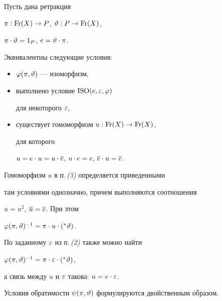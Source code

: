 \begin{thm} Пусть дана ретракция


$\pi: \operatorname{Fr}(X)\to P$, $\vartheta : P\to \operatorname{Fr}(X)$,


$\pi\cdot\vartheta=1_P$, $ e=\vartheta\cdot\pi$.


Эквивалентны следующие условия:


\begin{itemize}


\item[(1)] $\varphi(\pi,\vartheta)$ --- изоморфизм,


\item[(2)] выполнено условие ${\mathrm{ISO}}(e,\varepsilon,\varphi) $


для некоторого $ \varepsilon $,


\item[(3)] существует гомоморфизм $u:\operatorname{Fr}(X)\to \operatorname{Fr}(X)$,


для которого


$u= e\cdot u=u\cdot\overline{e}$, $u\cdot e=e$, $\overline{e}\cdot u= \overline{e}$.


\end{itemize}





Гомоморфизм $u$ в п.\,{\em (3)} определяется приведенными


там условиями однозначно, причем выполняются соотношения


$u=u^2$, $\overline{u}=\overline{e}$. При этом


$\varphi(\pi,\vartheta)^{-1}=\pi\cdot u\cdot({}^{\ast}{\vartheta})$.


По заданному $\varepsilon $ из п.\,{\em (2) } также можно найти


$\varphi(\pi,\vartheta)^{-1}=\pi\cdot \varepsilon\cdot({}^{\ast}{\vartheta})$,


а связь между $u$ и $\varepsilon$ такова: $u=e\cdot\varepsilon$.





Условия обратимости $\psi(\pi,\vartheta) $ формулируются двойственным образом.


\end{thm}





